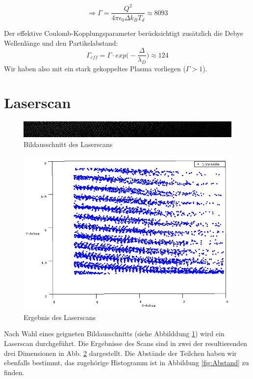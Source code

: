 $$
    \Rightarrow\Gamma=\frac{Q^2}{4\pi\epsilon_0\Delta k_BT_d}\approx 8093
$$

Der effektive Coulomb-Kopplungsparameter berücksichtigt zusätzlich die Debye Wellenlänge und den Partikelabstand:
$$
    \Gamma_{eff}=\Gamma\cdot exp\Big(-\frac{\Delta}{\lambda_D}\Big)\approx124
$$ 
Wir haben also mit ein stark gekoppeltes Plasma vorliegen ($\Gamma>1$).

\section{Laserscan}

\begin{figure}[ht]
    \includegraphics[width=\textwidth]{data/Video0001.jpg}
    \caption{Bildausschnitt des Laserscans}
    \label{fig:videobildausschnitt}
\end{figure}
\begin{figure}[ht]
    \includegraphics[width=\textwidth]{data/dreiDmodell.PNG}
    \caption{Ergebnis des Laserscans}
    \label{fig:scanerg}
\end{figure}

Nach Wahl eines geigneten Bildausschnitts (siehe Abbilddung \ref{fig:videobildausschnitt}) wird ein Laserscan durchgeführt. Die Ergebnisse des Scans sind in zwei der resultierenden drei Dimensionen in Abb. \ref{fig:scanerg} dargestellt. Die Abstände der Teilchen haben wir ebenfalls bestimmt, das zugehörige Histogramm ist in Abbildung \ref{fig:Abstand} zu finden.

